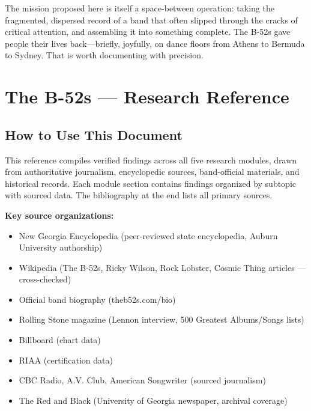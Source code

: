 \documentclass[11pt,letterpaper]{article}
\newcommand{\stageheader}[2]{%
  \noindent\colorbox{#2}{\makebox[\textwidth][l]{%
    \textcolor{white}{\bfseries\sffamily\hspace{6pt}#1\hspace{6pt}}}}%
  \vspace{0.5em}\par%
}
\begin{document}
The mission proposed here is itself a space-between operation: taking the fragmented, dispersed record of a band that often slipped through the cracks of critical attention, and assembling it into something complete. The B-52s gave people their lives back---briefly, joyfully, on dance floors from Athens to Bermuda to Sydney. That is worth documenting with precision.

\newpage

\stageheader{STAGE 2 --- RESEARCH REFERENCE}{secondary}

\section{The B-52s --- Research Reference}

\subsection{How to Use This Document}

This reference compiles verified findings across all five research modules, drawn from authoritative journalism, encyclopedic sources, band-official materials, and historical records. Each module section contains findings organized by subtopic with sourced data. The bibliography at the end lists all primary sources.

\textbf{Key source organizations:}
\begin{itemize}[noitemsep]
  \item New Georgia Encyclopedia (peer-reviewed state encyclopedia, Auburn University authorship)
  \item Wikipedia (The B-52s, Ricky Wilson, Rock Lobster, Cosmic Thing articles --- cross-checked)
  \item Official band biography (theb52s.com/bio)
  \item Rolling Stone magazine (Lennon interview, 500 Greatest Albums/Songs lists)
  \item Billboard (chart data)
  \item RIAA (certification data)
  \item CBC Radio, A.V. Club, American Songwriter (sourced journalism)
  \item The Red and Black (University of Georgia newspaper, archival coverage)
\end{itemize}
\end{document}
